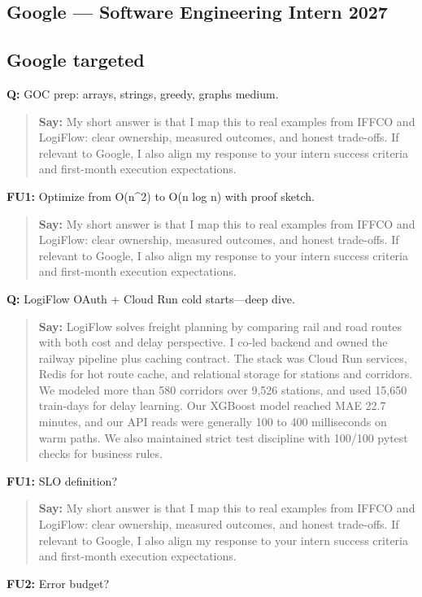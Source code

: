 \documentclass[9pt,a4paper]{article}
\begin{document}
\subsection{Google --- Software Engineering Intern 2027}
\subsection{Google targeted}
\textbf{Q:} GOC prep: arrays, strings, greedy, graphs medium.

\begin{quote}\small\textbf{Say:} My short answer is that I map this to real examples from IFFCO and LogiFlow: clear ownership, measured outcomes, and honest trade-offs. If relevant to Google, I also align my response to your intern success criteria and first-month execution expectations.\end{quote}
\vspace{2mm}
\textbf{FU1:} Optimize from O(n\textasciicircum{}2) to O(n log n) with proof sketch.

\begin{quote}\small\textbf{Say:} My short answer is that I map this to real examples from IFFCO and LogiFlow: clear ownership, measured outcomes, and honest trade-offs. If relevant to Google, I also align my response to your intern success criteria and first-month execution expectations.\end{quote}
\vspace{2mm}
\textbf{Q:} LogiFlow OAuth + Cloud Run cold starts---deep dive.

\begin{quote}\small\textbf{Say:} LogiFlow solves freight planning by comparing rail and road routes with both cost and delay perspective. I co-led backend and owned the railway pipeline plus caching contract. The stack was Cloud Run services, Redis for hot route cache, and relational storage for stations and corridors. We modeled more than 580 corridors over 9,526 stations, and used 15,650 train-days for delay learning. Our XGBoost model reached MAE 22.7 minutes, and our API reads were generally 100 to 400 milliseconds on warm paths. We also maintained strict test discipline with 100/100 pytest checks for business rules.\end{quote}
\vspace{2mm}
\textbf{FU1:} SLO definition?

\begin{quote}\small\textbf{Say:} My short answer is that I map this to real examples from IFFCO and LogiFlow: clear ownership, measured outcomes, and honest trade-offs. If relevant to Google, I also align my response to your intern success criteria and first-month execution expectations.\end{quote}
\vspace{2mm}
\textbf{FU2:} Error budget?
\end{document}
